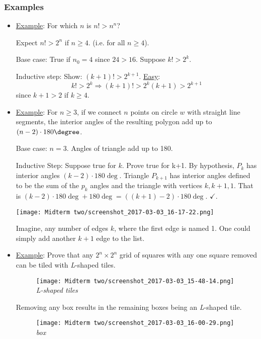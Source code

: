 \documentclass[12pt]{article}
\begin{document}
\subsubsection{Examples}
\label{sec:org231ec8f}
\begin{itemize}
\item \uline{Example}: For which \(n\) is \(n!>n^{n}\)?

Expect \(n!>2^n\) if \(n\ge{}4\). (i.e. for all \(n\ge{}4\)).

Base case: True if \(n_{0}=4\) since \(24>16\). Suppose \(k!>2^{k}\). 

Inductive step: Show: \((k+1)!>2^{k+1}\). \uline{Easy}: $$k!>2^{k} \Rightarrow
      (k+1)!>2^{k}(k+1)>2^{k+1}$$ since \(k+1>2\) if \(k\ge{}4\).

\item \uline{Example}: For \(n\ge3\), if we connect \(n\) points on circle \(w\) with straight
line segments, the interior angles of the resulting polygon add up to
\((n-2)\cdot180\degree\).

Base case: \(n=3\). Angles of triangle add up to 180\textdegree{}. 

Inductive Step: Suppose true for \(k\). Prove true for k+1. By hypothesis,
\(P_{k}\) has interior angles \((k-2)\cdot180\deg\). Triangle \(P_{k+1}\) has
interior angles defined to be the sum of the \(p_{k}\) angles and the triangle
with vertices \(k, k+1, 1\). That is \((k-2)\cdot180\deg + 180\deg =
      ((k+1)-2)\cdot180\deg\). \(\checkmark\).

\begin{center}
\texttt{[image: Midterm two/screenshot\_2017-03-03\_16-17-22.png]}
\end{center} Imagine, any number of
edges \(k\), where the first edge is named 1. One could simply add another
\(k+1\) edge to the list.

\item \uline{Example}: Prove that any \(2^n\times2^n\) grid of squares with any one
square removed can be tiled with \emph{L}-shaped tiles.

\begin{figure}[htbp]
\centering
\texttt{[image: Midterm two/screenshot\_2017-03-03\_15-48-14.png]}
\Leftarrow\textit{L-shaped tiles}
\end{figure} Removing any box
results in the remaining boxes being an \emph{L}-shaped tile.

\begin{figure}[htbp]
\centering
\texttt{[image: Midterm two/screenshot\_2017-03-03\_16-00-29.png]}
\Leftarrow\textit{box}
\end{figure} 


\end{itemize}
\end{document}
